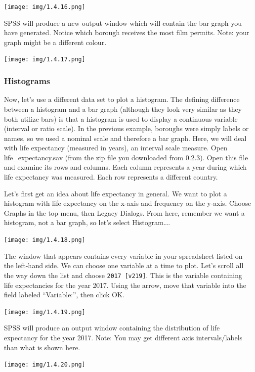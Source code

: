 \documentclass[
]{book}
\begin{document}
\texttt{[image: img/1.4.16.png]}

SPSS will produce a new output window which will contain the bar graph you have generated. Notice which borough receives the most film permits. Note: your graph might be a different colour.

\texttt{[image: img/1.4.17.png]}

\hypertarget{histograms}{%
\subsubsection{Histograms}\label{histograms}}

Now, let's use a different data set to plot a histogram. The defining difference between a histogram and a bar graph (although they look very similar as they both utilize bars) is that a histogram is used to display a continuous variable (interval or ratio scale). In the previous example, boroughs were simply labels or names, so we used a nominal scale and therefore a bar graph. Here, we will deal with life expectancy (measured in years), an interval scale measure. Open life\_expectancy.sav (from the zip file you downloaded from 0.2.3). Open this file and examine its rows and columns. Each column represents a year during which life expectancy was measured. Each row represents a different country.

Let's first get an idea about life expectancy in general. We want to plot a histogram with life expectancy on the x-axis and frequency on the y-axis. Choose {Graphs} in the top menu, then {Legacy Dialogs}. From here, remember we want a histogram, not a bar graph, so let's select {Histogram\ldots{}}.

\texttt{[image: img/1.4.18.png]}

The window that appears contains every variable in your spreadsheet listed on the left-hand side. We can choose one variable at a time to plot. Let's scroll all the way down the list and choose \texttt{2017\ {[}v219{]}}. This is the variable containing life expectancies for the year 2017. Using the arrow, move that variable into the field labeled ``Variable:'', then click {OK}.

\texttt{[image: img/1.4.19.png]}

SPSS will produce an output window containing the distribution of life expectancy for the year 2017. Note: You may get different axis intervals/labels than what is shown here.

\texttt{[image: img/1.4.20.png]}
\end{document}
